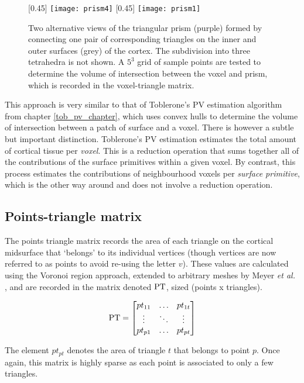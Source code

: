 \begin{figure}[H]
\centering
\subcaptionbox{\label{prism1}}[0.45\textwidth]
{\texttt{[image: prism4]}}
\subcaptionbox{\label{prism2}}[0.45\textwidth]
{\texttt{[image: prism1]}}
\caption{Two alternative views of the triangular prism (purple) formed by connecting one pair of corresponding triangles on the inner and outer surfaces (grey) of the cortex. The subdivision into three tetrahedra is not shown. A $5^3$ grid of sample points are tested to determine the volume of intersection between the voxel and prism, which is recorded in the voxel-triangle matrix.} 
\label{prism}
\end{figure}

This approach is very similar to that of Toblerone's PV estimation algorithm from chapter \ref{tob_pv_chapter}, which uses convex hulls to determine the volume of intersection between a patch of surface and a voxel. There is however a subtle but important distinction. Toblerone's PV estimation estimates the total amount of cortical tissue per \textit{voxel}. This is a reduction operation that sums together all of the contributions of the surface primitives within a given voxel. By contrast, this process estimates the contributions of neighbourhood voxels per \textit{surface primitive}, which is the other way around and does not involve a reduction operation. 

\subsection{Points-triangle matrix}
The points triangle matrix records the area of each triangle on the cortical midsurface that `belongs' to its individual vertices (though vertices are now referred to as points to avoid re-using the letter $v$). These values are calculated using the Voronoi region approach, extended to arbitrary meshes by Meyer \textit{et al.} \cite{Meyer2003}, and are recorded in the matrix denoted $\mathrm{PT}$, sized (points x triangles). 

\begin{equation}
\mathrm{PT} = 
\begin{bmatrix}
pt_{11} & \ldots & pt_{1t} \\
\vdots & \ddots & \vdots \\
pt_{p1} & \ldots & pt_{pt}
\end{bmatrix}
\end{equation}

The element $pt_{pt}$ denotes the area of triangle $t$ that belongs to point $p$. Once again, this matrix is highly sparse as each point is associated to only a few triangles. 

